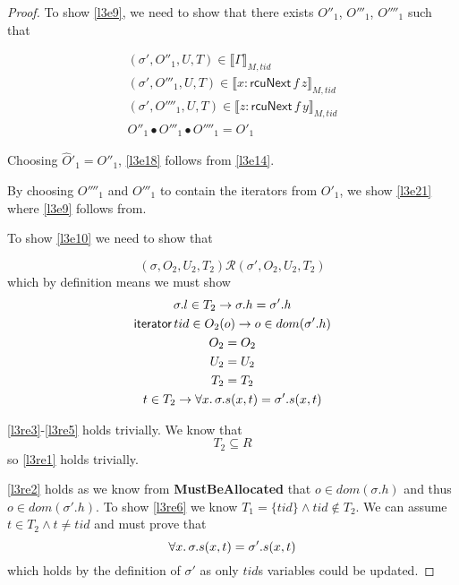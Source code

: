 \begin{proof}
To show \ref{l3e9}, we need to show that there exists  $O''_{1}$, $O'''_{1}$, $O''''_{1}$ such that 

\begin{gather} \label{l3e18}
(\sigma', O''_{1},U ,T) \in \llbracket \Gamma \rrbracket_{M,tid}
\\
 \label{l3e19}
(\sigma', O'''_{1},U ,T) \in \llbracket x:\mathsf{rcuNext} \, f \, z \rrbracket_{M,tid}
\\
 \label{l3e20}
(\sigma', O''''_{1},U ,T) \in \llbracket z:\mathsf{rcuNext} \,f \, y \rrbracket_{M,tid}
\\ 
\label{l3e21}
O''_{1} \bullet O'''_{1} \bullet O''''_{1} = O'_{1}
\end{gather}

Choosing $\hat{O}'_{1} = O''_{1}$, \ref{l3e18} follows from \ref{l3e14}.

By choosing $O''''_{1}$ and $O'''_{1}$ to contain the iterators from ${O}'_{1}$, we show \ref{l3e21} where \ref{l3e9} follows from.

To show \ref{l3e10} we need to show that 

\[
(\sigma, O_{2}, U_{2}, T_{2}) \mathcal{R} (\sigma', O_{2}, U_{2}, T_{2})
\]
which by definition means we must show
\begin{gather}
\label{l3re1}
\sigma.l \in T_{2} \rightarrow \sigma.h = \sigma'.h
\\
\label{l3re2}
\textsf{iterator} \, tid \in O_{2}(o) \rightarrow  o \in dom(\sigma'.h)
\\
\label{l3re3}
O_{2} = O_{2}
\\
\label{l3re4}
U_{2} = U_{2}
\\
\label{l3re5}
T_{2} = T_{2}
\\
\label{l3re6}
t \in T_{2} \rightarrow \forall x \ldotp \sigma.s(x,t) = \sigma'.s(x,t)
\end{gather}

\ref{l3re3}-\ref{l3re5} holds trivially. We know that 
\[T_{2} \subseteq R\]
so \ref{l3re1} holds trivially.

\ref{l3re2} holds as we know from \textsf{\textbf{MustBeAllocated}} that $o \in dom(\sigma.h)$ and thus $o \in dom(\sigma'.h)$. To show \ref{l3re6} we know $T_{1} = \{tid\} \land tid \notin T_{2}$.  We can assume $t \in T_{2} \land t \ne tid$ and must prove that 
\[
\forall x \ldotp \sigma.s(x,t) = \sigma'.s(x,t) 
\]
which holds by the definition of $\sigma'$ as only $tid$s variables could be updated. 


\end{proof}
